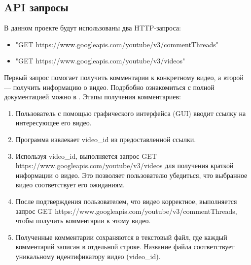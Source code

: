 	\subsection{API запросы}
		В данном проекте будут использованы два HTTP-запроса:
		\begin{itemize}
			\item "GET https://www.googleapis.com/youtube/v3/commentThreads"
			\item "GET https://www.googleapis.com/youtube/v3/videos"
		\end{itemize}
	 	Первый запрос помогает получить комментарии к конкретному видео, а второй — получить информацию о видео. Подрбобно ознакомиться с полной документацией можно в \cite{YouTubeAPI}.
	 	 Этапы получения комментариев: 
	 	\begin{enumerate}
	 		\item Пользователь с помощью графического интерфейса (GUI) вводит ссылку на интересующее его видео.
	 		\item Программа извлекает video\_id из предоставленной ссылки.
	 		\item Используя video\_id, выполняется запрос GET https://www.googleapis.com/youtube/v3/videos для получения краткой информации о видео. Это позволяет пользователю убедиться, что выбранное видео соответствует его ожиданиям.
	 		\item После подтверждения пользователем, что видео корректное, выполняется запрос GET https://www.googleapis.com/youtube/v3/commentThreads, чтобы получить комментарии к этому видео.
	 		\item Полученные комментарии сохраняются в текстовый файл, где каждый комментарий записан в отдельной строке. Название файла соответствует уникальному идентификатору видео (video\_id).
	 	\end{enumerate}
	

